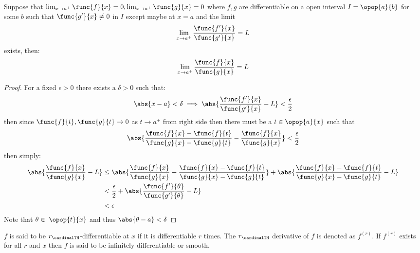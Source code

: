 \begin{theorem}
    Suppose that \(\lim_{x \to a^+}{\func{f}{x}} = 0,\lim_{x \to a^+}{\func{g}{x}} = 0 \) where \(f,g\) are differentiable on a open interval \(I = \opop{a}{b}\) for some \(b\) such that \(\func{g'}{x} \neq 0\) in \(I\) except maybe at \(x = a\) and the limit
    \begin{equation*}
        \lim_{x \to a^+}{\dfrac{\func{f'}{x}}{\func{g'}{x}}} = L
    \end{equation*}
    exists, then:
    \begin{equation*}
        \lim_{x \to a^+}{\dfrac{\func{f}{x}}{\func{g}{x}}} = L
    \end{equation*}
\end{theorem}
\begin{proof}
    For a fixed \(\epsilon > 0\) there exists a \(\delta > 0\) such that:
    \begin{equation*}
        \abs{x - a} < \delta \implies \abs{\dfrac{\func{f'}{x}}{\func{g'}{x}} - L} < \dfrac{ \epsilon}{2}
    \end{equation*}
    then since \(\func{f}{t}, \func{g}{t} \to 0\) as \(t \to a^+\) from right side then there must be a \(t \in \opop{a}{x}\) such that
    \begin{equation*}
        \abs{\dfrac{\func{f}{x} - \func{f}{t}}{\func{g}{x} - \func{g}{t}} - \dfrac{\func{f}{x}}{\func{g}{x}}} < \dfrac{\epsilon}{2}
    \end{equation*}
    then simply:
    \begin{align}
        \abs{\dfrac{\func{f}{x}}{\func{g}{x}} - L} & \leq \abs{\dfrac{\func{f}{x}}{\func{g}{x}} - \dfrac{\func{f}{x} - \func{f}{t}}{\func{g}{x} - \func{g}{t}} } + \abs{\dfrac{\func{f}{x} - \func{f}{t}}{\func{g}{x} - \func{g}{t}} - L} \\
                                                   & < \dfrac{\epsilon}{2} + \abs{\dfrac{\func{f'}{\theta}}{\func{g'}{\theta}} - L}                                                                                                       \\
                                                   & < \epsilon
    \end{align}
    Note that \(\theta \in \; \opop{t}{x}\) and thus \(\abs{\theta - a} < \delta \)
\end{proof}
\begin{definition}
    \(f\) is said to be \(r_{\cardinalTH}\)-differentiable at \(x\) if it is differentiable \(r\) times. The \(r_{\cardinalTH}\) derivative of \(f\) is denoted as \(f^{(r)}\). If \(f^{(r)}\) exists for all \(r\) and \(x\) then \(f\) is said to be infinitely differentiable or smooth.
\end{definition}
